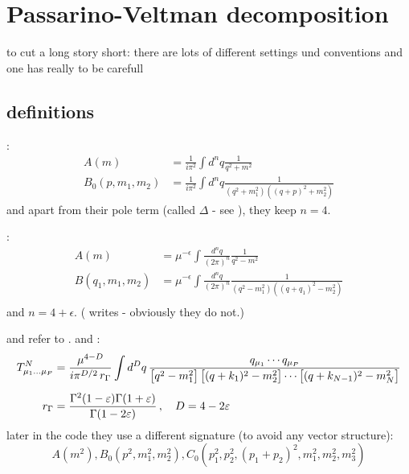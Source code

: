 \documentclass[
  english,		%
  a4paper,		%
  11pt,			%
  DIV=12,		%
  titlepage,
  toc=bibnumbered,
  parskip=full,  	%
  headings=normal,
  BCOR=12mm,
  numbers=noenddot
]{scrartcl}
\begin{document}
\section{Passarino-Veltman decomposition}
to cut a long story short: there are lots of different settings und conventions and one has really to be carefull

\subsection{definitions}
\cite{Passarino:1978jh}:
\begin{align}
A(m) &= \frac 1 {i\pi^2}\int d^nq\frac 1 {q^2+m^2}\\
B_0(p,m_1,m_2) &= \frac 1 {i\pi^2}\int d^nq\frac 1 {(q^2+m_1^2)((q+p)^2+m_2^2)}
\end{align}
and apart from their pole term (called $\Delta$ - see \cite[eq. D.1]{Passarino:1978jh}), they keep $n=4$.

\cite{PhysRevD4054,Bojak:2000eu}:
\begin{align}
A(m) &= \mu^{-\epsilon}\int\frac{d^nq}{(2\pi)^n} \frac 1 {q^2-m^2}\\
B(q_1,m_1,m_2) &= \mu^{-\epsilon}\int\frac{d^nq}{(2\pi)^n} \frac 1 {(q^2-m_1^2)((q+q_1)^2-m_2^2)}\\
\end{align}
and $n=4+\epsilon$. (\cite{PhysRevD4054} writes  - obviously they do not.)

\HEPMath\cite{wiebusch_hepmath_2015} and \FeynCalc\cite{Mertig:1990an,Shtabovenko:2016sxi} refer to \LoopTools\cite{Hahn:1998yk,LoopTools212Guide}. \cite[eq. (1.1)]{LoopTools212Guide} and \cite[eq. (2.6)]{Ellis:2011cr}:
\begin{align}
T_{\mu_1\ldots\mu_P}^N &=
\frac{\mu^{4 - D}}{i\pi^{D/2}\,r_\Gamma}
\int d^Dq\,
\frac{q_{\mu_1}\cdots q_{\mu_P}}
  {\bigl[q^2 - m_1^2\bigr]\,
   \bigl[(q + k_1)^2 - m_2^2\bigr] \cdots
   \bigl[(q + k_{N - 1})^2 - m_N^2\bigr]} \\[1ex]
\notag
r_\Gamma &= \frac{\Gamma^2(1 - \varepsilon)\Gamma(1+\varepsilon)}
  {\Gamma(1 - 2\varepsilon)}\,,
\quad D = 4 - 2\varepsilon\,
\end{align}
later in the code they use a different signature (to avoid any vector structure):
\begin{equation}
A(m^2), B_0(p^2,m_1^2,m_2^2), C_0(p_1^2,p_2^2,(p_1+p_2)^2,m_1^2,m_2^2,m_3^2)
\end{equation}
\end{document}
